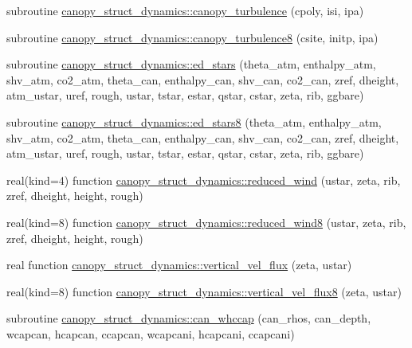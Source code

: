 \begin{DoxyCompactItemize}
\item 
subroutine \hyperlink{namespacecanopy__struct__dynamics_ac7eef4d24c3e07ccb461d418e32d466e}{canopy\+\_\+struct\+\_\+dynamics\+::canopy\+\_\+turbulence} (cpoly, isi, ipa)
\item 
subroutine \hyperlink{namespacecanopy__struct__dynamics_ab65e289b4069536fa3342bc3034db824}{canopy\+\_\+struct\+\_\+dynamics\+::canopy\+\_\+turbulence8} (csite, initp, ipa)
\item 
subroutine \hyperlink{namespacecanopy__struct__dynamics_a2418e416a98f5c0dec59aeb173f92f75}{canopy\+\_\+struct\+\_\+dynamics\+::ed\+\_\+stars} (theta\+\_\+atm, enthalpy\+\_\+atm, shv\+\_\+atm, co2\+\_\+atm, theta\+\_\+can, enthalpy\+\_\+can, shv\+\_\+can, co2\+\_\+can, zref, dheight, atm\+\_\+ustar, uref, rough, ustar, tstar, estar, qstar, cstar, zeta, rib, ggbare)
\item 
subroutine \hyperlink{namespacecanopy__struct__dynamics_ae0835c779480eba52b24d54c83b952cb}{canopy\+\_\+struct\+\_\+dynamics\+::ed\+\_\+stars8} (theta\+\_\+atm, enthalpy\+\_\+atm, shv\+\_\+atm, co2\+\_\+atm, theta\+\_\+can, enthalpy\+\_\+can, shv\+\_\+can, co2\+\_\+can, zref, dheight, atm\+\_\+ustar, uref, rough, ustar, tstar, estar, qstar, cstar, zeta, rib, ggbare)
\item 
real(kind=4) function \hyperlink{namespacecanopy__struct__dynamics_ae5504447c798d15053109bc4f8ff9346}{canopy\+\_\+struct\+\_\+dynamics\+::reduced\+\_\+wind} (ustar, zeta, rib, zref, dheight, height, rough)
\item 
real(kind=8) function \hyperlink{namespacecanopy__struct__dynamics_a4bfef6570fcebda5f22600fd0660ee0c}{canopy\+\_\+struct\+\_\+dynamics\+::reduced\+\_\+wind8} (ustar, zeta, rib, zref, dheight, height, rough)
\item 
real function \hyperlink{namespacecanopy__struct__dynamics_a1453d7575881d7ee657f67e0853c51a9}{canopy\+\_\+struct\+\_\+dynamics\+::vertical\+\_\+vel\+\_\+flux} (zeta, ustar)
\item 
real(kind=8) function \hyperlink{namespacecanopy__struct__dynamics_a2d40fd080c1c03b7c112ff3861e89458}{canopy\+\_\+struct\+\_\+dynamics\+::vertical\+\_\+vel\+\_\+flux8} (zeta, ustar)
\item 
subroutine \hyperlink{namespacecanopy__struct__dynamics_a22db7ca326d1421e76c858aa60687950}{canopy\+\_\+struct\+\_\+dynamics\+::can\+\_\+whccap} (can\+\_\+rhos, can\+\_\+depth, wcapcan, hcapcan, ccapcan, wcapcani, hcapcani, ccapcani)
\item 

\end{DoxyCompactItemize}
